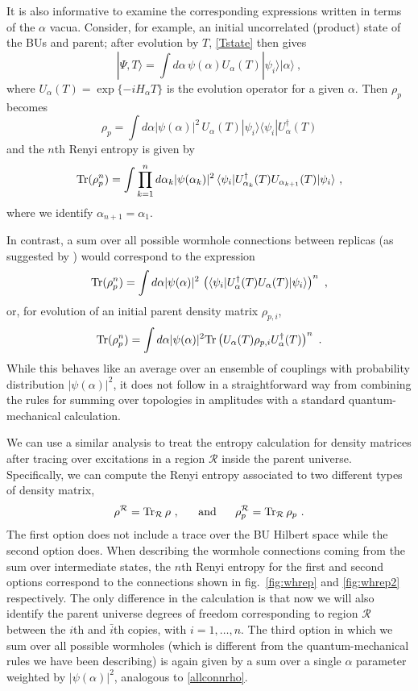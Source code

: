 \documentclass[11pt]{article}
\numberwithin{equation}{section}
\newcommand{\beq}{\begin{equation}}
\newcommand{\eeq}{\end{equation}}
\newcommand{\Tr}{{\rm Tr}}
\begin{document}
It is also informative to examine the corresponding expressions written in terms of the $\alpha$ vacua.  Consider, for example, an initial uncorrelated (product) state of the BUs and parent; after evolution by $T$, \eqref{Tstate} then gives
\beq\label{alphaevol}
|\Psi, T\rangle = \int d\alpha\, \psi(\alpha) U_\alpha(T) |\psi_i\rangle |\alpha\rangle\ ,
\eeq
where $U_\alpha(T) = \exp\{-i H_\alpha T\}$ is the evolution operator for a given $\alpha$.  Then $\rho_p$ becomes
\beq
\rho_p = \int d\alpha |\psi(\alpha)|^2\,  U_\alpha(T) |\psi_i\rangle \langle \psi_i| U_\alpha^\dagger(T)
\eeq
and the $n$th Renyi entropy is given by
\beq
\Tr(\rho_p^n) = \int \prod_{k=1}^n d\alpha_k |\psi(\alpha_k)|^2\, \langle \psi_i| U_{\alpha_k}^\dagger(T) U_{\alpha_{k+1}}(T) |\psi_i\rangle\ ,
\eeq
where we identify $\alpha_{n+1}=\alpha_1$.

In contrast, a sum over all possible wormhole connections between replicas (as suggested by \cite{Almheiri:2019qdq, Penington:2019kki}) would correspond to the expression
\beq\label{allconn}
\Tr(\rho_p^n) = \int d\alpha |\psi(\alpha)|^2\,  \left(\langle \psi_i| U_{\alpha}^\dagger(T) U_{\alpha}(T) |\psi_i\rangle\right)^n\ ,
\eeq
or, for evolution of an initial parent density matrix $\rho_{p,i}$, 
\beq\label{allconnrho}
\Tr(\rho_p^n) =  \int d\alpha |\psi(\alpha)|^2 \Tr\left(  U_{\alpha}(T)\rho_{p,i }U_{\alpha}^\dagger(T) \right)^n\ .
\eeq
While this behaves like an average over an ensemble of couplings with probability distribution $|\psi(\alpha)|^2$, it does not follow in a straightforward way from combining the rules for summing over topologies in amplitudes with a standard quantum-mechanical calculation.

We can use a similar analysis to treat the  entropy calculation for density matrices after tracing over excitations in a region $\mathcal{R}$ inside the parent universe. Specifically, we can compute the Renyi entropy associated to two different types of density matrix,
\begin{equation}
\rho^\mathcal{R} = {\rm Tr}_\mathcal{R}\, \rho\ ,~~~~~\text{and}~~~~~\rho_p^\mathcal{R} = {\rm Tr}_\mathcal{R}\, \rho_p\ .
\end{equation}
The first option does not include a trace over the BU Hilbert space while the second option does. 
When describing the wormhole connections coming from the sum over intermediate states, the $n$th Renyi entropy for the first and second options correspond to the connections shown in fig.~\ref{fig:whrep} and \ref{fig:whrep2} respectively. The only difference in the calculation is that now we will also identify the parent universe degrees of freedom corresponding to region $\mathcal{R}$ between the $i$th and $\bar{i}$th copies, with $i=1,\ldots, n$. The third option in which we sum over all possible wormholes (which is different from the quantum-mechanical rules we have been describing) is again  given by a sum over a single $\alpha$ parameter weighted by $|\psi(\alpha)|^2$, analogous to \eqref{allconnrho}.
\end{document}
